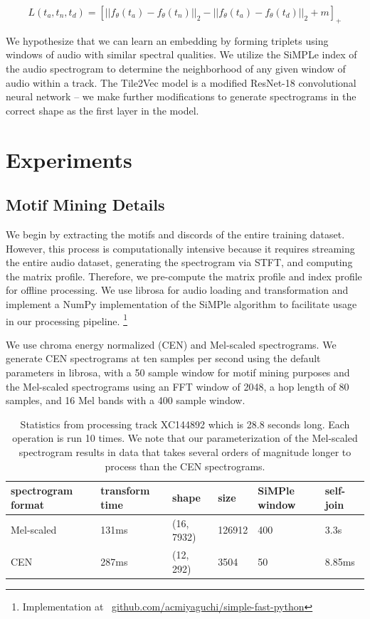 \documentclass[
]{ceurart}
\begin{document}
\begin{equation}
    L(t_a, t_n, t_d) = \left[
        ||f_{\theta}(t_a) - f_{\theta}(t_n)||_2
        - ||f_{\theta}(t_a) - f_{\theta}(t_d)||_2
        +m
    \right]_+
\end{equation}


We hypothesize that we can learn an embedding by forming triplets using windows of audio with similar spectral qualities. We utilize the SiMPLe index of the audio spectrogram to determine the neighborhood of any given window of audio within a track. The Tile2Vec model is a modified ResNet-18 convolutional neural network -- we make further modifications to generate spectrograms in the correct shape as the first layer in the model.

\section{Experiments}

\subsection{Motif Mining Details}

We begin by extracting the motifs and discords of the entire training dataset. However, this process is computationally intensive because it requires streaming the entire audio dataset, generating the spectrogram via STFT, and computing the matrix profile. Therefore, we pre-compute the matrix profile and index profile for offline processing. We use librosa \cite{librosa} for audio loading and transformation and implement a NumPy implementation of the SiMPle algorithm to facilitate usage in our processing pipeline. \footnote{Implementation at \
\href{https://github.com/acmiyaguchi/simple-fast-python}{github.com/acmiyaguchi/simple-fast-python}}

We use chroma energy normalized (CEN) and Mel-scaled spectrograms. We generate CEN spectrograms at ten samples per second using the default parameters in librosa, with a 50 sample window for motif mining purposes and the Mel-scaled spectrograms using an FFT window of 2048, a hop length of 80 samples, and 16 Mel bands with a 400 sample window.

\begin{table}[]
\begin{tabular}{|l|l|l|l|l|l|}
\hline
spectrogram format & transform time & shape      & size   & SiMPle window & self-join \\ \hline
Mel-scaled         & 131ms          & (16, 7932) & 126912 & 400           & 3.3s      \\ \hline
CEN                & 287ms          & (12, 292)  & 3504   & 50            & 8.85ms    \\ \hline
\end{tabular}
\caption{Statistics from processing track XC144892 which is 28.8 seconds long. Each operation is run 10 times. We note that our parameterization of the Mel-scaled spectrogram results in data that takes several orders of magnitude longer to process than the CEN spectrograms.}
\label{tab:spectrogram}
\end{table}
\end{document}
